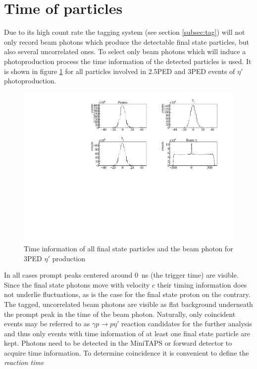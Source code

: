 \section{Time of particles}
\label{sec:time}
Due to its high count rate the tagging system (see section \ref{subsec:tag}) will not only record beam photons which produce the detectable final state particles, but also several uncorrelated ones. To select only beam photons which will induce a photoproduction process the time information of the detected particles is used. It is shown in figure \ref{fig:time} for all particles involved in 2.5PED and 3PED events of $\eta'$ photoproduction. 
\begin{figure}[htbp]
	\centering
	\includegraphics[width=\linewidth]{../figs/hydrogen/time/times.pdf}
	\caption{Time information of all final state particles and the beam photon for 3PED $\eta'$ production}
	\label{fig:time}
\end{figure} 
In all cases prompt peaks centered around \SI{0}{\nano\s} (the trigger time) are visible. Since the final state photons move with velocity $c$ their timing information does not underlie fluctuations, as is the case for the final state proton on the contrary. The tagged, uncorrelated beam photons are visible as flat background underneath the prompt peak in the time of the beam photon. Naturally, only coincident events may be referred to  as $\gamma p\to p\eta'$ reaction candidates for the further analysis and thus only events with time information of at least one final state particle are kept. Photons need to be detected in the MiniTAPS or forward
detector to acquire time information. To determine coincidence it is convenient to define the \emph{reaction time} 
